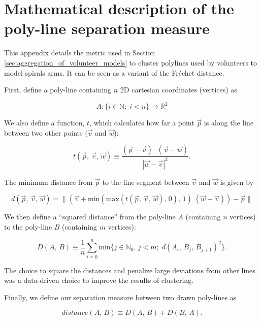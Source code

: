 \documentclass[../main.tex]{subfiles}
\begin{document}
\section{Mathematical description of the poly-line separation measure}
\label{appendix:clustering_maths}

This appendix details the metric used in Section \ref{sec:aggregation_of_volunteer_models} to cluster poly\-lines used by volunteers to model spirals arms. It can be seen as a variant of the Fréchet distance.


First, define a poly-line containing $n$ 2D cartesian coordinates (vertices) as

\begin{equation}
A: \{i \in \mathbb{N};\;i<n\} \longrightarrow \mathbb{R}
^2\end{equation}

We also define a function, $t$, which calculates how far a point $\vec{p}$ is along the line between two other points ($\vec{v}$ and $\vec{w}$):

\begin{equation}
t(\vec{p},\,\vec{v},\,\vec{w}) \equiv \frac{(\vec{p} - \vec{v})\cdot(\vec{v} - \vec{w})}{|\vec{w} - \vec{v}|^2}.
\end{equation}

The minimum distance from $\vec{p}$ to the line segment between $\vec{v}$ and $\vec{w}$ is given by

\begin{equation}
d(\vec{p},\,\vec{v},\,\vec{w}) = \|\left(\vec{v} + \mathrm{min}(\mathrm{max}(t(\vec{p},\,\vec{v},\,\vec{w}),\, 0),\, 1)\;(\vec{w} - \vec{v})\right) - \vec{p}\|
\end{equation}

We then define a ``squared distance'' from the poly-line $A$ (containing $n$ vertices) to the poly-line $B$ (containing $m$ vertices):

\begin{equation}
D(A,\,B) \equiv \frac{1}{n}\sum_{i = 0}^{n} \mathrm{min}\{j \in \mathbb{N}_0,\, j < m;\; d(A_i,\, B_j,\, B_{j+1})^2\}.
\end{equation}

The choice to square the distances and penalize large deviations from other lines was a data-driven choice to improve the results of clustering.

Finally, we define our separation measure between two drawn poly-lines as

\begin{equation}
distance(A,\,B) \equiv D(A,\,B) + D(B,\,A).
\end{equation}
\end{document}

